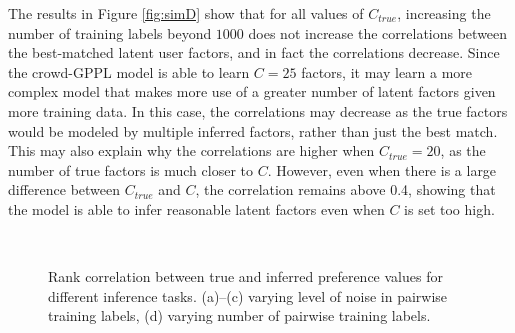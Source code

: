 The results in Figure \ref{fig:simD} show that for all values of $C_{true}$, increasing the
number of training labels beyond $1000$ does not increase the correlations between the best-matched
latent user factors, and in fact the correlations decrease. Since the crowd-GPPL model
is able to learn $C=25$ factors, it may learn a more complex model that makes
more use of a greater number of latent factors given more training data.
In this case, the correlations may decrease as the true factors would be modeled by
multiple inferred factors, rather than just the best match. 
This may also explain why the correlations are higher when $C_{true} = 20$, as the
number of true factors is much closer to $C$. However, even when there is a large difference 
between $C_{true}$ and $C$, 
the correlation remains above 0.4, showing that the model is able to infer reasonable 
latent factors even when $C$ is set too high. 
\begin{figure}
 \\
\caption{Rank correlation between true and inferred preference values for different inference tasks.  (a)--(c) varying level of noise in pairwise training labels, (d) varying number of pairwise training labels. 
}
\end{figure}


